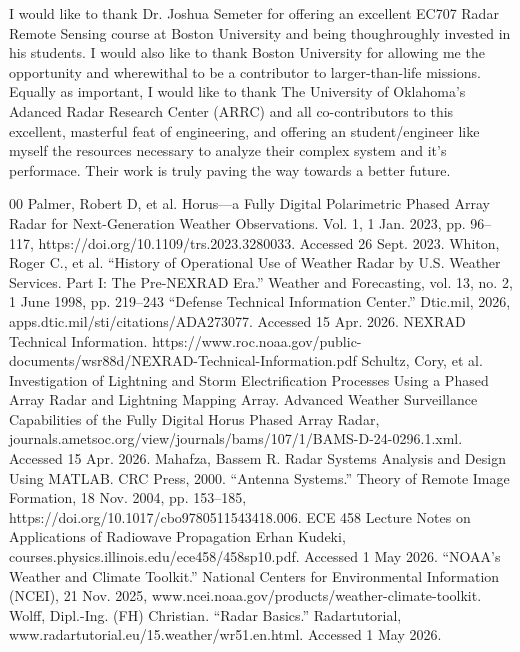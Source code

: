 \documentclass[conference]{IEEEtran}
\begin{document}
I would like to thank Dr. Joshua Semeter for offering an excellent EC707 Radar Remote Sensing course at Boston University and being thoughroughly invested in his students. I would also like to thank Boston University for allowing me the opportunity and wherewithal to be a contributor to larger-than-life missions. Equally as important, I would like to thank The University of Oklahoma's Adanced Radar Research Center (ARRC) and all co-contributors to this excellent, masterful feat of engineering, and offering an student/engineer like myself the resources necessary to analyze their complex system and it's performace. Their work is truly paving the way towards a better future.
\begin{thebibliography}{00}
 Palmer, Robert D, et al. Horus—a Fully Digital Polarimetric Phased Array Radar for Next-Generation Weather Observations. Vol. 1, 1 Jan. 2023, pp. 96–117, https://doi.org/10.1109/trs.2023.3280033. Accessed 26 Sept. 2023.
 Whiton, Roger C., et al. “History of Operational Use of Weather Radar by U.S. Weather Services. Part I: The Pre-NEXRAD Era.” Weather and Forecasting, vol. 13, no. 2, 1 June 1998, pp. 219–243
 “Defense Technical Information Center.” Dtic.mil, 2026, apps.dtic.mil/sti/citations/ADA273077. Accessed 15 Apr. 2026.
NEXRAD Technical Information. https://www.roc.noaa.gov/public-documents/wsr88d/NEXRAD-Technical-Information.pdf
 Schultz, Cory, et al. Investigation of Lightning and Storm Electrification Processes Using a Phased Array Radar and Lightning Mapping Array.
 Advanced Weather Surveillance Capabilities of the Fully Digital Horus Phased Array Radar, journals.ametsoc.org/view/journals/bams/107/1/BAMS-D-24-0296.1.xml. Accessed 15 Apr. 2026. 
 Mahafza, Bassem R. Radar Systems Analysis and Design Using MATLAB. CRC Press, 2000. 
 “Antenna Systems.” Theory of Remote Image Formation, 18 Nov. 2004, pp. 153–185, https://doi.org/10.1017/cbo9780511543418.006.
 ECE 458 Lecture Notes on Applications of Radiowave Propagation Erhan Kudeki, courses.physics.illinois.edu/ece458/458sp10.pdf. Accessed 1 May 2026.  
 “NOAA’s Weather and Climate Toolkit.” National Centers for Environmental Information (NCEI), 21 Nov. 2025, www.ncei.noaa.gov/products/weather-climate-toolkit. 
 Wolff, Dipl.-Ing. (FH) Christian. “Radar Basics.” Radartutorial, www.radartutorial.eu/15.weather/wr51.en.html. Accessed 1 May 2026. 
\end{thebibliography}
\end{document}
